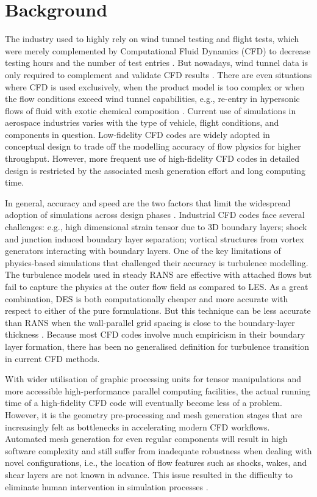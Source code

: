 \documentclass[11pt]{article}
\begin{document}
\section{Background}
The industry used to highly rely on wind tunnel testing and flight tests, which were merely complemented by Computational Fluid Dynamics (CFD) to decrease testing hours and the number of test entries \cite {Jameson1999Re-engineeringComputation}. But nowadays, wind tunnel data is only required to complement and validate CFD results \cite {Malik2012RoleRD}. There are even situations where CFD is used exclusively, when the product model is too complex or when the flow conditions exceed wind tunnel capabilities, e.g., re-entry in hypersonic flows of fluid with exotic chemical composition \cite {Wright2010AMissions}. Current use of simulations in aerospace industries varies with the type of vehicle, flight conditions, and components in question. Low-fidelity CFD codes are widely adopted in conceptual design to trade off the modelling accuracy of flow physics for higher throughput. However, more frequent use of high-fidelity CFD codes in detailed design is restricted by the associated mesh generation effort and long computing time.

In general, accuracy and speed are the two factors that limit the widespread adoption of simulations across design phases \cite {Slotnick2014CFDAerosciences}. Industrial CFD codes face several challenges: e.g., high dimensional strain tensor due to 3D boundary layers; shock and junction induced boundary layer separation; vortical structures from vortex generators interacting with boundary layers. One of the key limitations of physics-based simulations that challenged their accuracy is turbulence modelling. The turbulence models \cite {Wilcox1993TurbulenceCFD} used in steady RANS are effective with attached flows but fail to capture the physics at the outer flow field as compared to LES. As a great combination, DES is both computationally cheaper and more accurate with respect to either of the pure formulations. But this technique can be less accurate than RANS when the wall-parallel grid spacing is close to the boundary-layer thickness \cite {Spalart2008Detached-EddySimulation}. Because most CFD codes involve much empiricism in their boundary layer formation, there has been no generalised definition for turbulence transition in current CFD methods.

With wider utilisation of graphic processing units for tensor manipulations and more accessible high-performance parallel computing facilities, the actual running time of a high-fidelity CFD code will eventually become less of a problem. However, it is the geometry pre-processing and mesh generation stages that are increasingly felt as bottlenecks in accelerating modern CFD workflows. Automated mesh generation for even regular components will result in high software complexity and still suffer from inadequate robustness when dealing with novel configurations, i.e., the location of flow features such as shocks, wakes, and shear layers are not known in advance. This issue resulted in the difficulty to eliminate human intervention in simulation processes \cite {Cary2021CFDPerspectives}.
\end{document}
